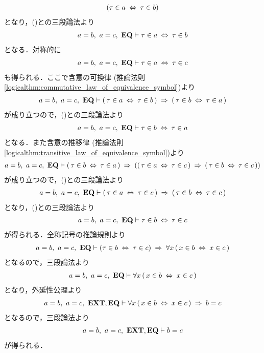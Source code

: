 \begin{sketch}
\begin{align}
			(\tau \in a \hspace{0.25em}\Leftrightarrow\hspace{0.25em} \tau \in b)
		\end{align}
		となり，()との三段論法より
		\begin{align}
			a = b,\ a = c,\ \mbox{{\bf EQ}} \vdash \tau \in a \hspace{0.25em}\Leftrightarrow\hspace{0.25em} \tau \in b
			\label{fom:thm_transitive_law_of_equality_4}
		\end{align}
		となる．対称的に
		\begin{align}
			a = b,\ a = c,\ \mbox{{\bf EQ}} \vdash \tau \in a \hspace{0.25em}\Leftrightarrow\hspace{0.25em} \tau \in c
			\label{fom:thm_transitive_law_of_equality_3}
		\end{align}
		も得られる．ここで含意の可換律
		(推論法則\ref{logicalthm:commutative_law_of_equivalence_symbol})より
		\begin{align}
			a = b,\ a = c,\ \mbox{{\bf EQ}} \vdash (\, \tau \in a \hspace{0.25em}\Leftrightarrow\hspace{0.25em} \tau \in b\, )
			\hspace{0.25em}\Rightarrow\hspace{0.25em} (\, \tau \in b \hspace{0.25em}\Leftrightarrow\hspace{0.25em} \tau \in a\, ) 
		\end{align}
		が成り立つので，()との三段論法より
		\begin{align}
			a = b,\ a = c,\ \mbox{{\bf EQ}} \vdash \tau \in b \hspace{0.25em}\Leftrightarrow\hspace{0.25em} \tau \in a
			\label{fom:thm_transitive_law_of_equality_5}
		\end{align}
		となる．また含意の推移律
		(推論法則\ref{logicalthm:transitive_law_of_equivalence_symbol})より
		\begin{align}
			a = b,\ a = c,\ \mbox{{\bf EQ}} \vdash (\, \tau \in b \hspace{0.25em}\Leftrightarrow\hspace{0.25em} \tau \in a\, )
			\hspace{0.25em}\Rightarrow\hspace{0.25em} ((\, \tau \in a \hspace{0.25em}\Leftrightarrow\hspace{0.25em} \tau \in c\, )
			\hspace{0.25em}\Rightarrow\hspace{0.25em} (\, \tau \in b \hspace{0.25em}\Leftrightarrow\hspace{0.25em} \tau \in c\, )) 
		\end{align}
		が成り立つので，()との三段論法より
		\begin{align}
			a = b,\ a = c,\ \mbox{{\bf EQ}} \vdash (\, \tau \in a \hspace{0.25em}\Leftrightarrow\hspace{0.25em} \tau \in c\, )
			\hspace{0.25em}\Rightarrow\hspace{0.25em} (\, \tau \in b \hspace{0.25em}\Leftrightarrow\hspace{0.25em} \tau \in c\, )
		\end{align}
		となり，()との三段論法より
		\begin{align}
			a = b,\ a = c,\ \mbox{{\bf EQ}} \vdash \tau \in b \hspace{0.25em}\Leftrightarrow\hspace{0.25em} \tau \in c
		\end{align}
		が得られる．全称記号の推論規則より
		\begin{align}
			a = b,\ a = c,\ \mbox{{\bf EQ}} \vdash (\tau \in b \hspace{0.25em}\Leftrightarrow\hspace{0.25em} \tau \in c)
			\hspace{0.25em}\Rightarrow\hspace{0.25em} \forall x\, (\, x \in b \hspace{0.25em}\Leftrightarrow\hspace{0.25em} x \in c\, )
		\end{align}
		となるので，三段論法より
		\begin{align}
			a = b,\ a = c,\ \mbox{{\bf EQ}} \vdash \forall x\, (\, x \in b \hspace{0.25em}\Leftrightarrow\hspace{0.25em} x \in c\, )
		\end{align}
		となり，外延性公理より
		\begin{align}
			a = b,\ a = c,\ \mbox{{\bf EXT}},\mbox{{\bf EQ}} \vdash \forall x\, (\, x \in b \hspace{0.25em}\Leftrightarrow\hspace{0.25em} x \in c\, )
			\hspace{0.25em}\Rightarrow\hspace{0.25em} b = c
		\end{align}
		となるので，三段論法より
		\begin{align}
			a = b,\ a = c,\ \mbox{{\bf EXT}},\mbox{{\bf EQ}} \vdash b = c
		\end{align}
		が得られる．
		\QED
	\end{sketch}